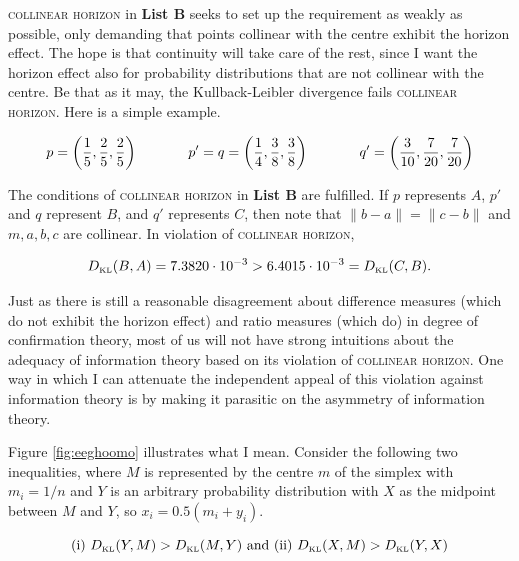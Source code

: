 \documentclass[12pt]{article}
\begin{document}
\textsc{collinear horizon} in \textbf{List B} seeks to set up the requirement
as weakly as possible, only demanding that points collinear with the
centre exhibit the horizon effect. The hope is that continuity will
take care of the rest, since I want the horizon effect also for
probability distributions that are not collinear with the centre. Be
that as it may, the Kullback-Leibler divergence fails
\textsc{collinear horizon}. Here is a simple example.

\begin{equation}
  \label{eq:ubiesohx}
    p=\left(\frac{1}{5},\frac{2}{5},\frac{2}{5}\right) \hspace{.5in}
    p'=q=\left(\frac{1}{4},\frac{3}{8},\frac{3}{8}\right)  \hspace{.5in}
    q'=\left(\frac{3}{10},\frac{7}{20},\frac{7}{20}\right)
\end{equation}

The conditions of \textsc{collinear horizon} in \textbf{List B} are
fulfilled. If $p$ represents $A$, $p'$ and $q$ represent $B$, and $q'$
represents $C$, then note that $\|b-a\|=\|c-b\|$ and $m,a,b,c$ are
collinear. In violation of \textsc{collinear horizon},

\begin{equation}
  \label{eq:eiloothu}
  D_{\mbox{\tiny KL}}(B,A)=7.3820\cdot{}10^{-3}>6.4015\cdot{}10^{-3}=D_{\mbox{\tiny KL}}(C,B).
\end{equation}

Just as there is still a reasonable disagreement about difference
measures (which do not exhibit the horizon effect) and ratio measures
(which do) in degree of confirmation theory, most of us will not have
strong intuitions about the adequacy of information theory based on
its violation of \textsc{collinear horizon}. One way in which I can
attenuate the independent appeal of this violation against information
theory is by making it parasitic on the asymmetry of information
theory.

Figure \ref{fig:eeghoomo} illustrates what I mean. Consider the
following two inequalities, where $M$ is represented by the centre
$m$ of the simplex with $m_{i}=1/n$ and $Y$ is an arbitrary
probability distribution with $X$ as the midpoint between $M$ and $Y$,
so $x_{i}=0.5(m_{i}+y_{i})$.

\begin{equation}
  \label{eq:dailoosu}
  \mbox{(i) }D_{\mbox{\tiny KL}}(Y,M)>D_{\mbox{\tiny KL}}(M,Y)\mbox{ and (ii) }D_{\mbox{\tiny KL}}(X,M)>D_{\mbox{\tiny KL}}(Y,X)
\end{equation}
\end{document}
